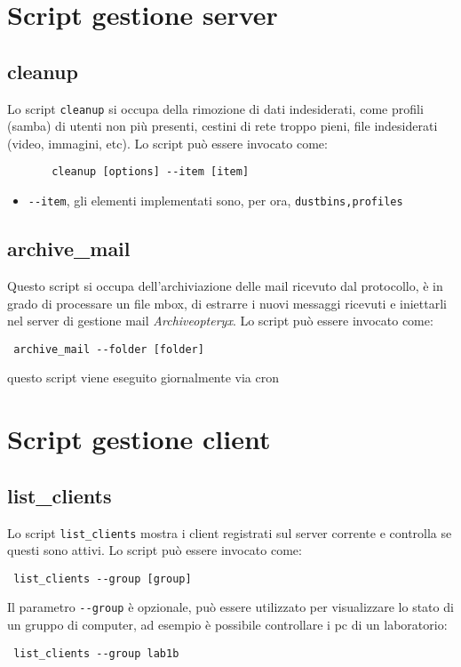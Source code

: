 \documentclass[a4paper,10pt,oneside]{memoir}
\begin{document}
 \chapter{Script gestione server}
    \section*{cleanup}
      Lo script \verb#cleanup# si occupa della rimozione di dati indesiderati, come profili (samba) di utenti non più presenti, cestini di rete troppo pieni, file indesiderati (video, immagini, etc). Lo script può essere invocato come:
      \begin{verbatim}
       cleanup [options] --item [item]
      \end{verbatim}
      \begin{itemize}
	\item \verb#--item#, gli elementi implementati sono, per ora, \verb#dustbins,profiles#  
      \end{itemize}
\section*{archive\_mail}

Questo script si occupa dell'archiviazione delle mail ricevuto dal protocollo, è in grado di processare un file mbox, di estrarre i nuovi messaggi ricevuti e iniettarli nel server di gestione mail \emph{Archiveopteryx}. Lo script può essere invocato come:
\begin{verbatim}
 archive_mail --folder [folder]
\end{verbatim}
questo script viene eseguito giornalmente via cron

 \chapter{Script gestione client}
\section*{list\_clients}
  Lo script \verb#list_clients# mostra i client registrati sul server corrente e controlla se questi sono attivi. Lo script può essere invocato come:
\begin{verbatim}
 list_clients --group [group]
\end{verbatim}
Il parametro \verb#--group# è opzionale, può essere utilizzato per visualizzare lo stato di un gruppo di computer, ad esempio è possibile controllare i pc di un laboratorio:
\begin{verbatim}
 list_clients --group lab1b
\end{verbatim}
\end{document}
